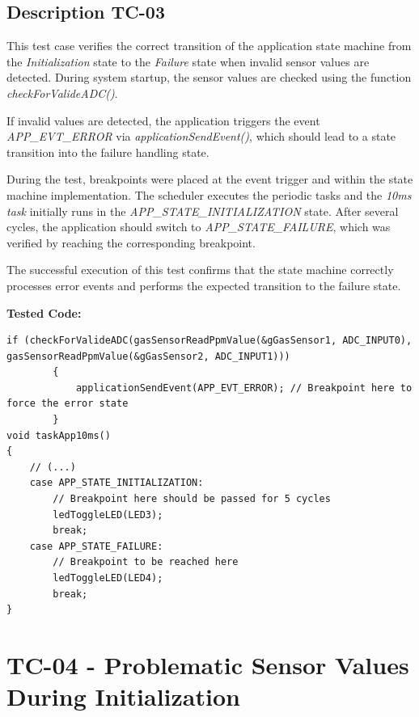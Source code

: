 \subsection{Description TC-03}

This test case verifies the correct transition of the application state machine from the 
\textit{Initialization} state to the \textit{Failure} state when invalid sensor values are detected. 
During system startup, the sensor values are checked using the function 
\textit{checkForValideADC()}.

If invalid values are detected, the application triggers the event 
\textit{APP\_EVT\_ERROR} via \textit{applicationSendEvent()}, which should lead to a 
state transition into the failure handling state.

During the test, breakpoints were placed at the event trigger and within the state machine 
implementation. The scheduler executes the periodic tasks and the \textit{10ms task} initially 
runs in the \textit{APP\_STATE\_INITIALIZATION} state. After several cycles, the application 
should switch to \textit{APP\_STATE\_FAILURE}, which was verified by reaching the corresponding 
breakpoint.

The successful execution of this test confirms that the state machine correctly processes 
error events and performs the expected transition to the failure state.

\textbf{Tested Code:}

\begin{lstlisting}[style=CStyle]
if (checkForValideADC(gasSensorReadPpmValue(&gGasSensor1, ADC_INPUT0), gasSensorReadPpmValue(&gGasSensor2, ADC_INPUT1)))
        {
            applicationSendEvent(APP_EVT_ERROR); // Breakpoint here to force the error state
        }
void taskApp10ms()
{
    // (...)
    case APP_STATE_INITIALIZATION:
        // Breakpoint here should be passed for 5 cycles
        ledToggleLED(LED3); 
        break;
    case APP_STATE_FAILURE:
        // Breakpoint to be reached here
        ledToggleLED(LED4);
        break;
}
\end{lstlisting}
\newpage

\section{TC-04 - Problematic Sensor Values During Initialization}

